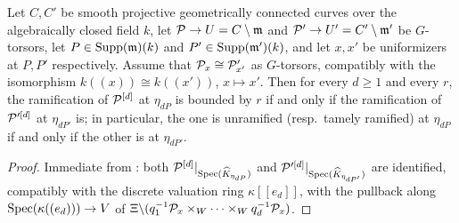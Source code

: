 \begin{cor}[Reduction to $\bP^1$]\label{cor:reduction_to_P1:reorg}
    Let $C, C'$ be smooth projective geometrically connected curves over the algebraically closed field $k$, let
    $\mathcal{P} \to U = C \setminus \mathfrak{m}$ and $\mathcal{P}' \to U' = C' \setminus \mathfrak{m}'$ be $G$-torsors, let
    $P \in \mathrm{Supp}(\mathfrak{m})(k)$ and $P' \in \mathrm{Supp}(\mathfrak{m}')(k)$, and let $x, x'$ be uniformizers at $P, P'$
    respectively. Assume that $\mathcal{P}_x \cong \mathcal{P}'_{x'}$ as $G$-torsors, compatibly with the isomorphism
    $k((x)) \cong k((x'))$, $x \mapsto x'$.
    Then for every $d \geq 1$ and every $r$, the ramification of $\mathcal{P}^{[d]}$ at $\eta_{dP}$ is bounded by $r$ if and only if
    the ramification of $\mathcal{P}'^{[d]}$ at $\eta_{dP'}$ is; in particular, the one is unramified (resp.\ tamely ramified) at
    $\eta_{dP}$ if and only if the other is at $\eta_{dP'}$.
\end{cor}
\begin{proof}
    Immediate from : both $\mathcal{P}^{[d]}|_{\operatorname{Spec}(\widehat{K}_{\eta_{dP}})}$ and
    $\mathcal{P}'^{[d]}|_{\operatorname{Spec}(\widehat{K}_{\eta_{dP'}})}$ are identified, compatibly with the discrete valuation ring
    $\kappa[[e_d]]$, with the pullback along $\operatorname{Spec}(\kappa((e_d))) \to V$ of
    $\Xi \backslash (q_1^{-1}\mathcal{P}_x \times_W \cdots \times_W q_d^{-1}\mathcal{P}_x)$.
\end{proof}


